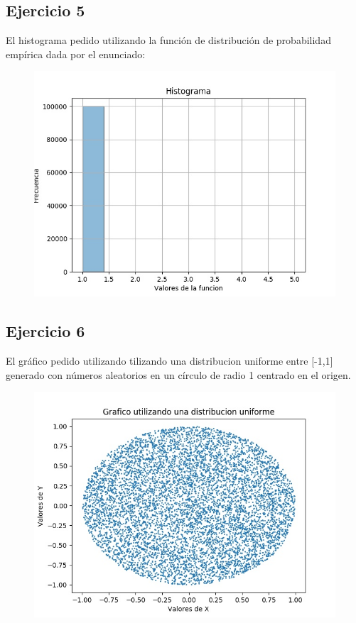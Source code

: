 \documentclass[11pt,a4paper]{article}
\begin{document}
	\subsection{Ejercicio 5}
		El histograma pedido utilizando la función de distribución de probabilidad empírica dada por el enunciado:
		\begin{figure}[H]
  			\centering
    			\includegraphics[width=14cm]{imagenes/histogramaEjer5}
		\end{figure}

	\subsection{Ejercicio 6}
		El gráfico pedido utilizando tilizando una distribucion uniforme entre [-1,1] generado con números aleatorios en un círculo de radio 1 centrado en el origen.
		\begin{figure}[H]
  			\centering
    			\includegraphics[width=14cm]{imagenes/histogramaEjer6}
		\end{figure}
\end{document}
